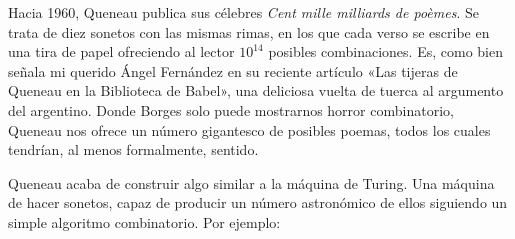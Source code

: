 \documentclass[11pt,a4paper]{article}
\begin{document}
%
%

Hacia 1960, Queneau publica sus célebres
\emph{Cent mille milliards de poèmes}. Se trata de diez sonetos con las mismas rimas, en los que cada verso se escribe en una tira de papel ofreciendo al lector $10^{14}$ posibles combinaciones. Es, como bien señala mi querido Ángel Fernández en su reciente artículo «Las tijeras de Queneau en la Biblioteca de Babel», una deliciosa vuelta de tuerca al argumento del argentino. Donde Borges solo puede mostrarnos horror combinatorio, Queneau nos ofrece un número gigantesco de posibles poemas, todos los cuales tendrían, al menos formalmente, sentido.

Queneau acaba de construir algo similar a la máquina de Turing. Una máquina de hacer sonetos, capaz de producir un número astronómico de ellos siguiendo un simple algoritmo combinatorio. Por ejemplo: 
\end{document}
